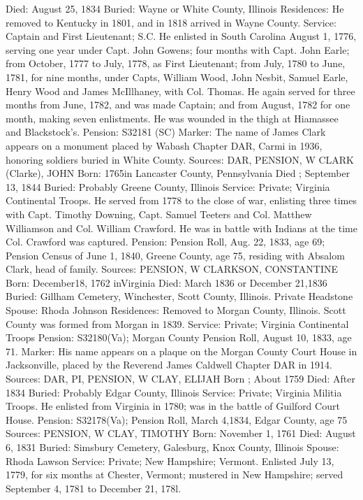 Died: August 25, 1834 
Buried: Wayne or White County, Illinois 
Residences: He removed to Kentucky in 1801, and in 1818 arrived in Wayne County. 
Service: Captain and First Lieutenant; S.C. He enlisted in South Carolina August 1, 1776, serving one year under Capt. John Gowens; four months with Capt. John Earle; from October, 1777 to July, 1778, as First Lieutenant; from July, 1780 to June, 1781, for nine months, under Capts, William Wood, John Nesbit, Samuel Earle, Henry Wood and James McIllhaney, with Col. Thomas. He again served for three months from June, 1782, and was made Captain; and from August, 1782 for one month, making seven enlistments. He was wounded in the thigh at Hiamassee and Blackstock's. 
Pension: S32181 (SC) 
Marker: The name of James Clark appears on a monument placed by Wabash Chapter DAR, Carmi in 1936, honoring soldiers buried in White County. 
Sources: DAR, PENSION, W 
CLARK (Clarke), JOHN 
Born: 1765in Lancaster County, Pennsylvania 
Died ; September 13, 1844 
Buried: Probably Greene County, Illinois 
Service: Private; Virginia Continental Troops. He served from 1778 to the close of war, enlisting three times with Capt. Timothy Downing, Capt. Samuel Teeters and Col. Matthew Williamson and Col. William Crawford. He was in battle with Indians at the time Col. Crawford was captured. 
Pension: Pension Roll, Aug. 22, 1833, age 69; Pension Census of June 1, 1840, Greene County, age 75, residing with Absalom Clark, head of family.  
Sources: PENSION, W 
CLARKSON, CONSTANTINE 
Born: December18, 1762 inVirginia 
Died: March 1836 or December 21,1836 
Buried: Gillham Cemetery, Winchester, Scott County, Illinois. 
Private Headstone 
Spouse: Rhoda Johnson 
Residences: Removed to Morgan County, Illinois. Scott County was formed from Morgan in 1839. 
Service: Private; Virginia Continental Troops Pension: S32180(Va); Morgan County Pension Roll, August 10, 1833, age 71. 
Marker: His name appears on a plaque on the Morgan County Court House in Jacksonville, placed by the Reverend James Caldwell Chapter DAR in 1914. 
Sources: DAR, PI, PENSION, W 
CLAY, ELIJAH 
Born ; About 1759 
Died: After 1834 
Buried: Probably Edgar County, Illinois 
Service: Private; Virginia Militia Troops. He enlisted from Virginia in 1780; was in the battle of Guilford Court House. 
Pension: S32178(Va); Pension Roll, March 4,1834, Edgar County, age 75 
Sources: PENSION, W 
CLAY, TIMOTHY 
Born: November 1, 1761 
Died: August 6, 1831 
Buried: Simsbury Cemetery, Galesburg, Knox County, Illinois 
Spouse: Rhoda Lawson 
Service: Private; New Hampshire; Vermont. Enlisted July 13, 1779, for six months at Chester, Vermont; mustered in New Hampshire; served September 4, 1781 to December 21, 178l. 

